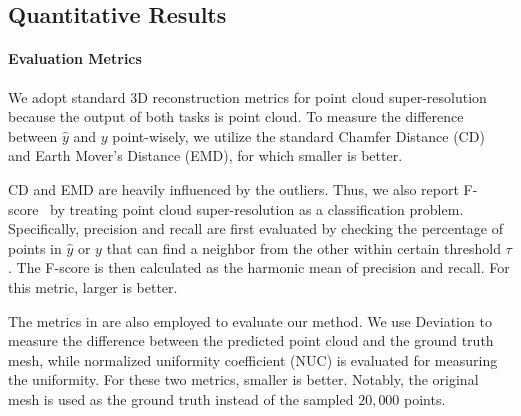\documentclass[10pt,twocolumn,letterpaper]{article}
\begin{document}
\subsection{Quantitative Results}
\paragraph{Evaluation Metrics}
We adopt standard 3D reconstruction metrics for point cloud super-resolution because the output of both tasks is point cloud.
To measure the difference between $\hat{y}$ and $y$ point-wisely, we utilize the standard Chamfer Distance (CD) and Earth Mover's Distance (EMD), for which smaller is better.

CD and EMD are heavily influenced by the outliers.
Thus, we also report F-score~\cite{sokolova2006beyond} by treating point cloud super-resolution as a classification problem.
Specifically, precision and recall are first evaluated by checking the percentage of points in $\hat{y}$ or $y$ that can find a neighbor from the other within certain threshold $\tau$.
The F-score is then calculated as the harmonic mean of precision and recall.
For this metric, larger is better.

The metrics in \cite{yu2018pu} are also employed to evaluate our method.
We use Deviation to measure the difference between the predicted point cloud and the ground truth mesh, while normalized uniformity coefficient (NUC) is evaluated for measuring the uniformity.
For these two metrics, smaller is better.
Notably, the original mesh is used as the ground truth instead of the sampled $20,000$ points.
\end{document}

